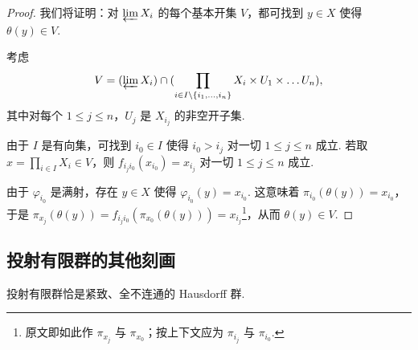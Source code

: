 \begin{proof}
我们将证明：对 $\varprojlim X_i$ 的每个基本开集 $V$，都可找到 $y\in X$ 使得 $\theta(y)\in V$.

考虑
\[
V=(\varprojlim X_i)\cap(\prod_{i\in I\setminus\{i_1,\ldots,i_n\}}X_i\times U_1\times\ldots U_n),
\]
其中对每个 $1\leq j\leq n$，$U_j$ 是 $X_{i_j}$ 的非空开子集.

由于 $I$ 是有向集，可找到 $i_0\in I$ 使得 $i_0>i_j$ 对一切 $1\leq j\leq n$ 成立. 若取 $x=\prod_{i\in I}X_i\in V$，则 $f_{i_ji_0}(x_{i_0})=x_{i_j}$ 对一切 $1\leq j\leq n$ 成立.

由于 $\varphi_{i_0}$ 是满射，存在 $y\in X$ 使得 $\varphi_{i_0}(y)=x_{i_0}$. 这意味着 $\pi_{i_0}(\theta(y))=x_{i_0}$，于是 $\pi_{x_j}(\theta(y))=f_{i_ji_0}(\pi_{x_0}(\theta(y)))=x_{i_j}$\footnote{原文即如此作 $\pi_{x_j}$ 与 $\pi_{x_0}$；按上下文应为 $\pi_{i_j}$ 与 $\pi_{i_0}$.}，从而 $\theta(y)\in V$.
\end{proof}

\subsection{投射有限群的其他刻画}

\begin{theorem}\label{c3-thm-2-5}
投射有限群恰是紧致、全不连通的 Hausdorff 群.
\end{theorem}

